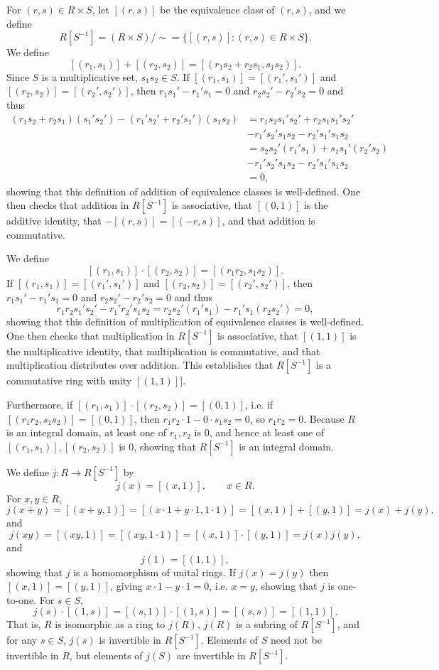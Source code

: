 \documentclass{article}
\theoremstyle{definition}
\begin{document}
For $(r,s) \in R \times S$, let $[(r,s)]$ be the equivalence class of $(r,s)$, and we define
\[
R[S^{-1}] = (R \times S) / \sim = \{[(r,s)] : (r,s) \in R \times S\}.
\]
We define
\[
[(r_1,s_1)]+[(r_2,s_2)] = [(r_1s_2+r_2s_1,s_1s_2)].
\]
Since $S$ is a multiplicative set, $s_1s_2 \in S$. If $[(r_1,s_1)]=[(r_1',s_1')]$ and $[(r_2,s_2)]=[(r_2',s_2')]$, then
$r_1s_1'-r_1's_1=0$ and $r_2s_2'-r_2's_2=0$
and thus
\begin{align*}
(r_1s_2+r_2s_1)(s_1's_2')-
(r_1's_2'+r_2's_1')(s_1s_2)&=r_1s_2s_1's_2'+r_2s_1s_1's_2'\\
&-r_1's_2's_1s_2-r_2's_1's_1s_2\\
&=s_2s_2'(r_1's_1)+s_1s_1'(r_2's_2)\\
&-r_1's_2's_1s_2-r_2's_1's_1s_2\\
&=0,
\end{align*}
showing that this definition of addition of equivalence classes is well-defined.
One then checks that addition in $R[S^{-1}]$ is associative, that 
$[(0,1)]$ is the additive identity, that $-[(r,s)]=[(-r,s)]$, and that addition is commutative.

We define 
\[
[(r_1,s_1)] \cdot [(r_2,s_2)] = [(r_1r_2,s_1s_2)].
\]
If $[(r_1,s_1)]=[(r_1',s_1')]$ and $[(r_2,s_2)]=[(r_2',s_2')]$, then
$r_1s_1'-r_1's_1=0$ and $r_2s_2'-r_2's_2=0$
and thus 
\[
r_1r_2s_1's_2'-r_1'r_2's_1s_2=
r_2s_2'(r_1's_1)
-r_1's_1(r_2s_2')
=0,
\]
showing that this definition of multiplication of equivalence classes is well-defined. 
One then checks that multiplication in $R[S^{-1}]$ is associative, that $[(1,1)]$ is the multiplicative identity, that
multiplication is commutative, and 
 that 
multiplication distributes over addition. This establishes that $R[S^{-1}]$ is a commutative ring with unity $[(1,1)]]$. 

Furthermore, if $[(r_1,s_1)] \cdot [(r_2,s_2)] = [(0,1)]$, i.e. if $[(r_1r_2,s_1s_2)]=[(0,1)]$, then
$r_1r_2\cdot 1 - 0\cdot s_1s_2=0$, so $r_1r_2=0$. Because $R$ is an integral domain, at least one of $r_1,r_2$ is $0$, and hence
at least one of $[(r_1,s_1)], [(r_2,s_2)]$ is $0$, showing that $R[S^{-1}]$ is an integral domain.

We define $j:R \to R[S^{-1}]$ by 
\[
j(x) = [(x,1)], \qquad x \in R.
\]
For $x,y \in R$,
\[
j(x+y)=[(x+y,1)]=[(x\cdot 1+y\cdot 1,1\cdot 1)]=[(x,1)]+[(y,1)]=j(x)+j(y),
\]
and 
\[
j(xy)=[(xy,1)]=[(xy,1\cdot 1)]=[(x,1)] \cdot [(y,1)] = j(x) j(y),
\]
and
\[
j(1)=[(1,1)],
\]
showing that $j$ is a homomorphism of unital rings.
If $j(x)=j(y)$ then $[(x,1)]=[(y,1)]$, giving $x\cdot 1-y\cdot 1=0$, i.e. $x=y$, showing that $j$ is one-to-one. 
For $s \in S$,
\[
j(s)\cdot [(1,s)]=[(s,1)]\cdot [(1,s)]=[(s,s)] = [(1,1)].
\]
That is, $R$ is isomorphic as a ring to $j(R)$, $j(R)$ is a subring of $R[S^{-1}]$, and for any $s \in S$, $j(s)$ is invertible in $R[S^{-1}]$. 
Elements of $S$ need not be invertible in $R$, but elements of $j(S)$ are invertible in $R[S^{-1}]$. 
\end{document}
